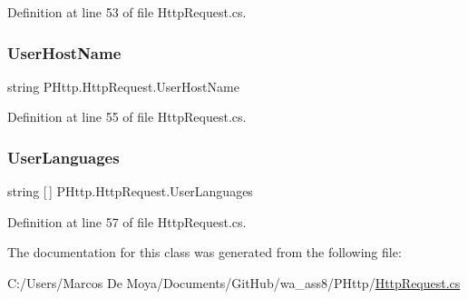 Definition at line 53 of file Http\+Request.\+cs.

\mbox{\label{class_p_http_1_1_http_request_a231930a81f9e4243c0c41cdb29b02800}} 
\subsubsection{\texorpdfstring{User\+Host\+Name}{UserHostName}}
{\footnotesize\ttfamily string P\+Http.\+Http\+Request.\+User\+Host\+Name\hspace{0.3cm}{\ttfamily [get]}}



Definition at line 55 of file Http\+Request.\+cs.

\mbox{\label{class_p_http_1_1_http_request_af13741758a514767c4b4b4f980a92b55}} 
\subsubsection{\texorpdfstring{User\+Languages}{UserLanguages}}
{\footnotesize\ttfamily string \mbox{[}$\,$\mbox{]} P\+Http.\+Http\+Request.\+User\+Languages\hspace{0.3cm}{\ttfamily [get]}}



Definition at line 57 of file Http\+Request.\+cs.



The documentation for this class was generated from the following file\+:\begin{DoxyCompactItemize}
\item 
C\+:/\+Users/\+Marcos De Moya/\+Documents/\+Git\+Hub/wa\+\_\+ass8/\+P\+Http/\hyperlink{_http_request_8cs}{Http\+Request.\+cs}\end{DoxyCompactItemize}
